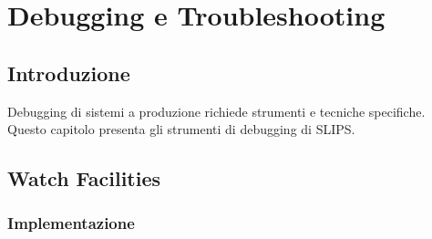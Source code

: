 
\chapter{Debugging e Troubleshooting}
\label{cap:debugging}

\section{Introduzione}

Debugging di sistemi a produzione richiede strumenti e tecniche specifiche. Questo capitolo presenta gli strumenti di debugging di SLIPS.

\section{Watch Facilities}

\subsection{Implementazione}

